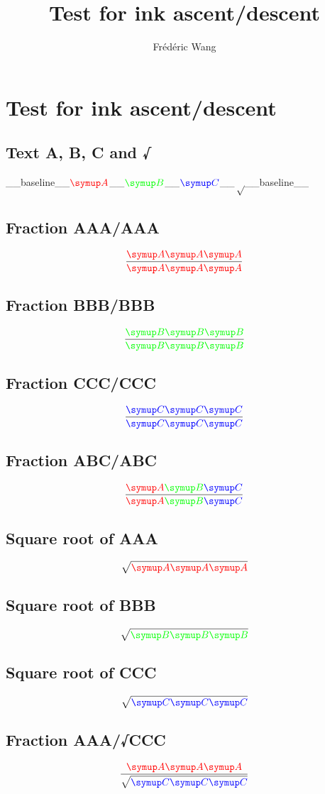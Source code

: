 \documentclass{article}
\title{Test for ink ascent/descent}
\author{Frédéric Wang}
\newcommand{\A}{\color{red}{\symup A}}
\newcommand{\B}{\color{green}{\symup B}}
\newcommand{\C}{\color{blue}{\symup C}}
\begin{document}
\maketitle

\section{Test for ink ascent/descent}

\subsection{Text A, B, C and √}

\_\_baseline\_\_$\A$\_\_$\B$\_\_$\C$\_\_$√$\_\_baseline\_\_

\subsection{Fraction AAA/AAA}

$$\frac{\A\A\A}{\A\A\A}$$

\subsection{Fraction BBB/BBB}

$$\frac{\B\B\B}{\B\B\B}$$

\subsection{Fraction CCC/CCC}

$$\frac{\C\C\C}{\C\C\C}$$

\subsection{Fraction ABC/ABC}

$$\frac{\A\B\C}{\A\B\C}$$

\subsection{Square root of AAA}

$$\sqrt{\A\A\A}$$

\subsection{Square root of BBB}

$$\sqrt{\B\B\B}$$

\subsection{Square root of CCC}

$$\sqrt{\C\C\C}$$

\subsection{Fraction AAA/√CCC}

$$\frac{\A\A\A}{\displaystyle \sqrt{\C\C\C}}$$
\end{document}
